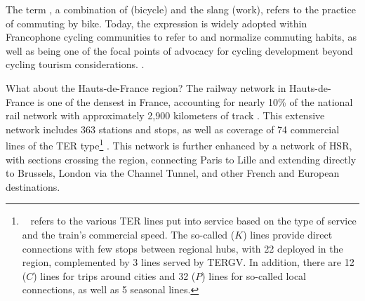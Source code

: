 \begin{refsegment}
{    The term , a combination of  (bicycle) and the slang  (work), refers to the practice of commuting by bike. Today, the expression is widely adopted within Francophone cycling communities to refer to and normalize commuting habits, as well as being one of the focal points of advocacy for cycling development beyond cycling tourism considerations.
} \textcolor{blue}{\autocites{ipsos_enquete_2023}{le_point_pratique_2023}}.%

What about the Hauts-de-France region? The railway network in Hauts-de-France is one of the densest in France, accounting for nearly 10\% of the national rail network with approximately 2,900 kilometers of track \textcolor{blue}{\autocites[11]{region_hauts-de-france_planification_2024}[51]{ceser_hauts-de-france_mobilite_2021}}. This extensive network includes 363 stations and stops, as well as coverage of 74 commercial lines of the \acrshort{TER} type\footnote{~
    \textcolor{blue}{\textcite[468]{sncf_voyageurs_trains_nodate}} refers to the various \acrshort{TER} lines put into service based on the type of service and the train's commercial speed. The so-called  (\(K\)) lines provide direct connections with few stops between regional hubs, with 22 deployed in the region, complemented by 3  lines served by \acrfull{TERGV}. In addition, there are 12  (\(C\)) lines for trips around cities and 32  (\(P\)) lines for so-called local connections, as well as 5 seasonal lines.
} \textcolor{blue}{\autocite{sncf_reseau_hauts--france_2024}}. This network is further enhanced by a network of \acrfull{HSR}, with sections crossing the region, connecting Paris to Lille and extending directly to Brussels, London via the Channel Tunnel, and other French and European destinations.%


\end{refsegment}
